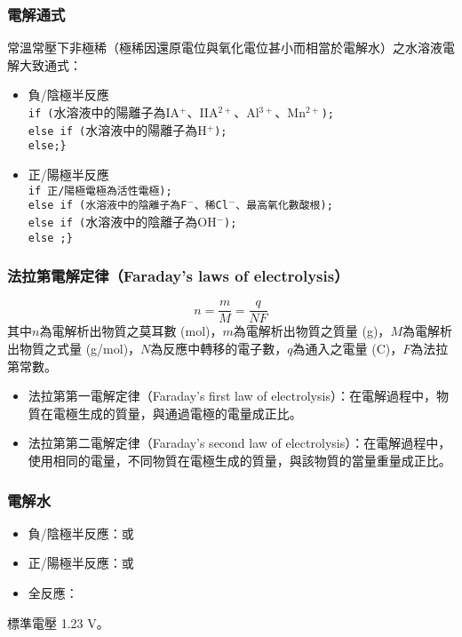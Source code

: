 \documentclass[a4paper,12pt]{article}
\begin{document}
\subsubsection{電解通式}
常溫常壓下非極稀（極稀因還原電位與氧化電位甚小而相當於電解水）之水溶液電解大致通式：
\begin{itemize}
\item 負/陰極半反應\text{\ \{}\\
\texttt{if\ (}水溶液中的陽離子為IA$^{+}$、IIA$^{2+}$、Al$^{3+}$、Mn$^{2+}$\texttt{)}\texttt{;}\\
\texttt{else if\ (}水溶液中的陽離子為H$^+$\texttt{)}\texttt{;}\\
\texttt{else}\texttt{;}\texttt{\}}
\item 正/陽極半反應\text{\ \{}\\
\texttt{if 正/陽極電極為活性電極\texttt{)}\texttt{;}\\
\texttt{else if\ (}水溶液中的陰離子為F$^-$、稀Cl$^-$、最高氧化數酸根}\texttt{)}\texttt{;}\\
\texttt{else if\ (}水溶液中的陰離子為OH$^-$\texttt{)}\texttt{;}\\
\texttt{else\ }\texttt{;}\texttt{\}}
\end{itemize}
\subsubsection{法拉第電解定律（Faraday's laws of electrolysis）}
\[n=\frac{m}{M}=\frac{q}{NF}\]
其中$n$為電解析出物質之莫耳數 (mol)，$m$為電解析出物質之質量 (g)，$M$為電解析出物質之式量 (g/mol)，$N$為反應中轉移的電子數，$q$為通入之電量 (C)，$F$為法拉第常數。
\begin{itemize}
\item 法拉第第一電解定律（Faraday's first law of electrolysis）：在電解過程中，物質在電極生成的質量，與通過電極的電量成正比。
\item 法拉第第二電解定律（Faraday's second law of electrolysis）：在電解過程中，使用相同的電量，不同物質在電極生成的質量，與該物質的當量重量成正比。
\end{itemize}
\subsubsection{電解水}
\begin{itemize}
\item 負/陰極半反應：或
\item 正/陽極半反應：或
\item 全反應：
\end{itemize}
標準電壓 1.23 V。
\end{document}
